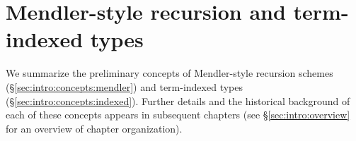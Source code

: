 \section{Mendler-style recursion and term-indexed types}
\label{sec:intro:concepts}
We summarize the preliminary concepts of
Mendler-style recursion schemes (\S\ref{sec:intro:concepts:mendler})
and term-indexed types (\S\ref{sec:intro:concepts:indexed}).
Further details and the historical background of each of these concepts
appears in subsequent chapters (see \S\ref{sec:intro:overview}
for an overview of chapter organization).

